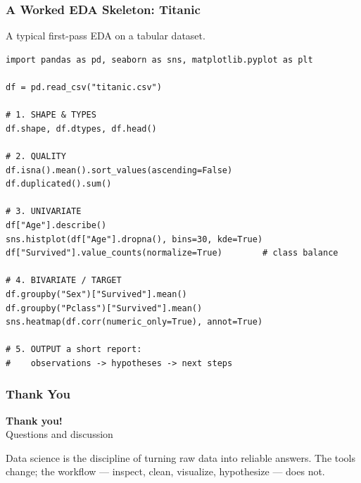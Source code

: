 \documentclass[aspectratio=169,10pt]{beamer}
\begin{document}
\begin{frame}[fragile]
\frametitle{A Worked EDA Skeleton: Titanic}
\small
A typical first-pass EDA on a tabular dataset.

\vspace{0.12cm}
\begin{lstlisting}[style=pycode]
import pandas as pd, seaborn as sns, matplotlib.pyplot as plt

df = pd.read_csv("titanic.csv")

# 1. SHAPE & TYPES
df.shape, df.dtypes, df.head()

# 2. QUALITY
df.isna().mean().sort_values(ascending=False)
df.duplicated().sum()

# 3. UNIVARIATE
df["Age"].describe()
sns.histplot(df["Age"].dropna(), bins=30, kde=True)
df["Survived"].value_counts(normalize=True)        # class balance

# 4. BIVARIATE / TARGET
df.groupby("Sex")["Survived"].mean()
df.groupby("Pclass")["Survived"].mean()
sns.heatmap(df.corr(numeric_only=True), annot=True)

# 5. OUTPUT a short report:
#    observations -> hypotheses -> next steps
\end{lstlisting}
\end{frame}


\begin{frame}
\frametitle{Thank You}
\vspace{1.75cm}
\begin{center}
{\fontsize{34}{40}\selectfont \textbf{Thank you!}}\\[0.45cm]
{\fontsize{18}{22}\selectfont Questions and discussion}
\end{center}
\vspace{0.80cm}
\begin{tcolorbox}[lecturebox,title=Course takeaway]
Data science is the discipline of turning raw data into reliable answers. The tools change; the workflow --- inspect, clean, visualize, hypothesize --- does not.
\end{tcolorbox}
\end{frame}
\end{document}
